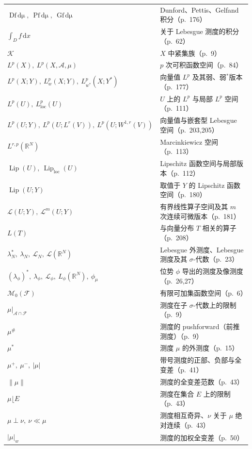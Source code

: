 \documentclass[../main.tex]{subfiles}
\begin{document}
\begin{longtable}{p{}p{}}
$\mathop{D\int_E f\,\mathrm{d}\mu(x)},\ \mathop{P\int_E f\,\mathrm{d}\mu(x)},\ \mathop{G\int_E f\,\mathrm{d}\mu(x)}$ & Dunford、Pettis、Gelfand 积分（p.~176）\\
$\int_D f\,\mathrm{d}x$ & 关于 Lebesgue 测度的积分（p.~62）\\
$\mathcal{K}$ & $X$ 中紧集族（p.~9）\\
$L^p(X),\ L^p(X,\mathcal{A},\mu)$ & $p$ 次可积函数空间（p.~84）\\
$L^p(X;Y),\ L^p_w(X;Y),\ L^p_{w^*}(X;Y^*)$ & 向量值 $L^p$ 及其弱、弱$^*$版本（p.~177）\\
$L^p(U),\ L^p_{\mathrm{loc}}(U)$ & $U$ 上的 $L^p$ 与局部 $L^p$ 空间（p.~111）\\
$L^p(U;Y),\ L^p(U;L^r(V)),\ L^p(U;W^{1,r}(V))$ & 向量值与嵌套型 Lebesgue 空间（p.~203,205）\\
$L^{r,p}(\mathbb{R}^N)$ & Marcinkiewicz 空间（p.~113）\\
$\operatorname{Lip}(U),\ \operatorname{Lip}_{\mathrm{loc}}(U)$ & Lipschitz 函数空间与局部版本（p.~112）\\
$\operatorname{Lip}(U;Y)$ & 取值于 $Y$ 的 Lipschitz 函数空间（p.~180）\\
$\mathcal{L}(U;Y),\ \mathcal{L}^m(U;Y)$ & 有界线性算子空间及其 $m$ 次连续可微版本（p.~181）\\
$L(T)$ & 与向量分布 $T$ 相关的算子（p.~208）\\
$\lambda_N^*,\ \lambda_N,\ \mathcal{L}_N,\ \mathcal{L}(\mathbb{R}^N)$ & Lebesgue 外测度、Lebesgue 测度及其 $\sigma$-代数（p.~23）\\
$(\lambda_\phi)^*,\ \lambda_\phi,\ \mathcal{L}_\phi,\ L_\phi(\mathbb{R}^N),\ \phi_\mu$ & 位势 $\phi$ 导出的测度及像测度（p.~26,27）\\
$\mathcal{M}_0(\mathcal{F})$ & 有限可加集函数空间（p.~6）\\
$\mu|_{\mathcal{A}\cap\mathcal{F}}$ & 测度在子 $\sigma$-代数上的限制（p.~9）\\
$\mu^\#$ & 测度的 pushforward（前推测度）（p.~9）\\
$\mu^*$ & 测度 $\mu$ 的外测度（p.~15）\\
$\mu^+,\ \mu^-,\ |\mu|$ & 带号测度的正部、负部与全变差（p.~41）\\
$\|\mu\|$ & 测度的全变差范数（p.~43）\\
$\mu\lfloor E$ & 测度在集合 $E$ 上的限制（p.~43）\\
$\mu\perp\nu,\ \nu\ll\mu$ & 测度相互奇异、$\nu$ 关于 $\mu$ 绝对连续（p.~43）\\
$|\mu|_w$ & 测度的加权全变差（p.~50）\\

\end{longtable}
\end{document}
